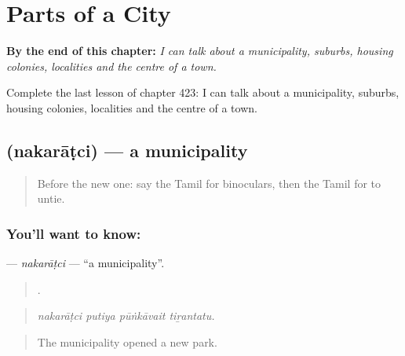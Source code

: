 
\chapter{Parts of a City}
\label{ch:ta-parts-of-a-city}

\begin{chapteropening}
\textbf{By the end of this chapter:} \emph{I can talk about a municipality, suburbs, housing colonies, localities and the centre of a town.}

Complete the last lesson of chapter 423: I can talk about a municipality, suburbs, housing colonies, localities and the centre of a town.
\end{chapteropening}

\section[\texorpdfstring{\ta{நகராட்சி} (nakarāṭci)}{நகராட்சி (nakarāṭci)}]{ (nakarāṭci) — a municipality}

\label{lesson:TA-C423-nakaratci}



\begin{quote}
Before the new one: say the Tamil for binoculars, then the Tamil for to untie.
\end{quote}

\subsection*{You'll want to know: }
\textbf{} — \emph{nakarāṭci} — \textquotedblleft{}a municipality\textquotedblright{}.

\begin{quote}
   .
\end{quote}

\begin{quote}
\emph{nakarāṭci putiya pūṅkāvait tiṟantatu.}
\end{quote}

\begin{quote}
The municipality opened a new park.
\end{quote}

